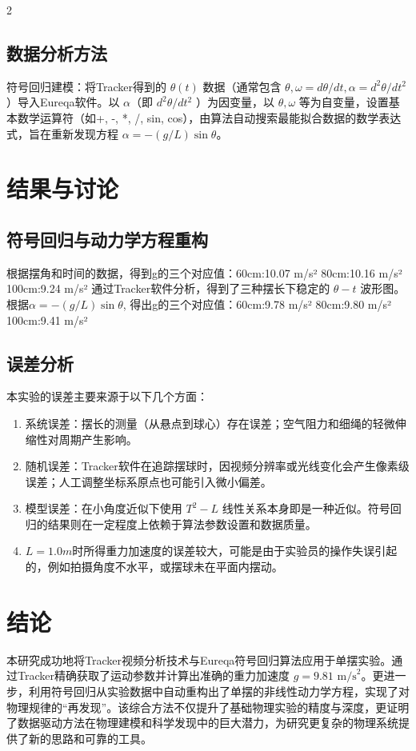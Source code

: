 \documentclass[12pt,a4paper]{article}
\begin{document}
\begin{multicols}{2}
    \subsection{\heiti 数据分析方法}

符号回归建模：将Tracker得到的 $\theta(t)$ 数据（通常包含 $\theta, \omega = d\theta/dt, \alpha = d^2\theta/dt^2$）导入Eureqa软件。以 $\alpha$（即 $d^2\theta/dt^2$ ）为因变量，以 $\theta, \omega$ 等为自变量，设置基本数学运算符（如+, -, *, /, sin, cos），由算法自动搜索最能拟合数据的数学表达式，旨在重新发现方程 $\alpha = - (g/L) \sin\theta$。

    \section{\heiti 结果与讨论}
    \subsection{\heiti 符号回归与动力学方程重构}
    \songti
    根据摆角和时间的数据，得到g的三个对应值：60cm:10.07 m/s² 80cm:10.16 m/s² 100cm:9.24 m/s²   
通过Tracker软件分析，得到了三种摆长下稳定的 $\theta - t$ 波形图。
根据$\alpha=-(g/L)\sin\theta$,
得出g的三个对应值：60cm:9.78 m/s² 80cm:9.80 m/s² 100cm:9.41 m/s²      \subsection{\heiti 误差分析}
    本实验的误差主要来源于以下几个方面：
\begin{enumerate}
\item 系统误差：摆长的测量（从悬点到球心）存在误差；空气阻力和细绳的轻微伸缩性对周期产生影响。
\item 随机误差：Tracker软件在追踪摆球时，因视频分辨率或光线变化会产生像素级误差；人工调整坐标系原点也可能引入微小偏差。
\item 模型误差：在小角度近似下使用 $T^2-L$ 线性关系本身即是一种近似。符号回归的结果则在一定程度上依赖于算法参数设置和数据质量。
\item $L=1.0m$时所得重力加速度的误差较大，可能是由于实验员的操作失误引起的，例如拍摄角度不水平，或摆球未在平面内摆动。
\end{enumerate}
\section{\heiti 结\quad 论}
    \songti
    本研究成功地将Tracker视频分析技术与Eureqa符号回归算法应用于单摆实验。通过Tracker精确获取了运动参数并计算出准确的重力加速度 $g = 9.81 \text{ m/s}^2$。更进一步，利用符号回归从实验数据中自动重构出了单摆的非线性动力学方程，实现了对物理规律的“再发现”。该综合方法不仅提升了基础物理实验的精度与深度，更证明了数据驱动方法在物理建模和科学发现中的巨大潜力，为研究更复杂的物理系统提供了新的思路和可靠的工具。
\end{multicols}
\end{document}
